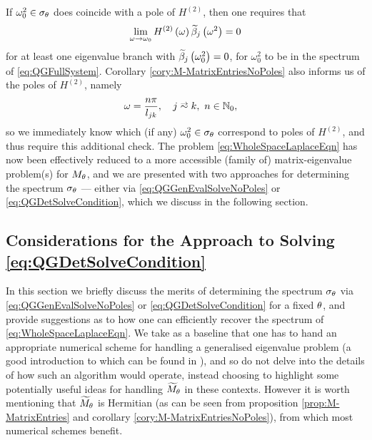 If $\omega_0^2\in\sigma_\theta$ does coincide with a pole of $H^{(2)}$, then one requires that 
\begin{align*}
	\lim_{\omega\rightarrow\omega_0}H^{(2)}\left( \omega \right)\widetilde{\beta}_j\left( \omega^2 \right) = 0
\end{align*}
for at least one eigenvalue branch with $\widetilde{\beta}_j\left( \omega_0^2 \right)=0$, for $\omega_0^2$ to be in the spectrum of \eqref{eq:QGFullSystem}.
Corollary \ref{cory:M-MatrixEntriesNoPoles} also informs us of the poles of $H^{(2)}$, namely 
\begin{align*}
	\omega &= \frac{n\pi}{l_{jk}}, \quad j\conLeft k, \ n\in\naturals_{0},
\end{align*}
so we immediately know which (if any) $\omega_0^2\in\sigma_\theta$ correspond to poles of $H^{(2)}$, and thus require this additional check.
The problem \eqref{eq:WholeSpaceLaplaceEqn} has now been effectively reduced to a more accessible (family of) matrix-eigenvalue problem(s) for $M_\theta$, and we are presented with two approaches for determining the spectrum $\sigma_\theta$ --- either via \eqref{eq:QGGenEvalSolveNoPoles} or \eqref{eq:QGDetSolveCondition}, which we discuss in the following section.

\subsection{Considerations for the Approach to Solving \eqref{eq:QGDetSolveCondition}} \label{ssec:ApproachConsiderations}
In this section we briefly discuss the merits of determining the spectrum $\sigma_\theta$ via \eqref{eq:QGGenEvalSolveNoPoles} or \eqref{eq:QGDetSolveCondition} for a fixed $\theta$, and provide suggestions as to how one can efficiently recover the spectrum of \eqref{eq:WholeSpaceLaplaceEqn}.
We take as a baseline that one has to hand an appropriate numerical scheme for handling a generalised eigenvalue problem (a good introduction to which can be found in \cite{guttel2017nonlinear}), and so do not delve into the details of how such an algorithm would operate, instead choosing to highlight some potentially useful ideas for handling $\widetilde{M}_\theta$ in these contexts.
However it is worth mentioning that $\widetilde{M}_\theta$ is Hermitian (as can be seen from proposition \ref{prop:M-MatrixEntries} and corollary \ref{cory:M-MatrixEntriesNoPoles}), from which most numerical schemes benefit.

